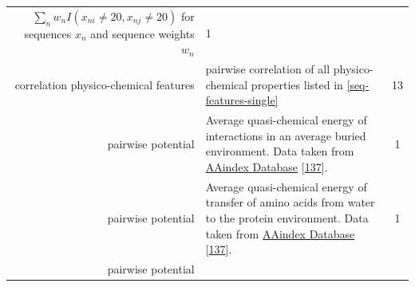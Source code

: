 \documentclass[12pt,a4paper,twoside]{book}
\theoremstyle{definition}
\theoremstyle{definition}
\theoremstyle{remark}
\begin{document}
\begin{longtable}[]{@{}rlc@{}}
\begin{minipage}[t]{0.50\columnwidth}
\(\sum_n w_n I(x_{ni} \! \neq \! 20, x_{nj} \! \neq \! 20)\) for
sequences \(x_n\) and sequence weights \(w_n\)\strut
\end{minipage} & \begin{minipage}[t]{0.18\columnwidth}\centering\strut
1\strut
\end{minipage}\tabularnewline
\begin{minipage}[t]{0.23\columnwidth}\raggedleft\strut
correlation physico-chemical features\strut
\end{minipage} & \begin{minipage}[t]{0.50\columnwidth}\raggedright\strut
pairwise correlation of all physico-chemical properties listed in
\ref{seq-features-single}\strut
\end{minipage} & \begin{minipage}[t]{0.18\columnwidth}\centering\strut
13\strut
\end{minipage}\tabularnewline
\begin{minipage}[t]{0.23\columnwidth}\raggedleft\strut
pairwise potential\strut
\end{minipage} & \begin{minipage}[t]{0.50\columnwidth}\raggedright\strut
Average quasi-chemical energy of interactions in an average buried
environment. Data taken from
\href{http://www.genome.jp/dbget-bin/www_bget?aaindex:MIYS990107}{AAindex
Database} {[}\protect\hyperlink{ref-Kawashima2008}{137}{]}.\strut
\end{minipage} & \begin{minipage}[t]{0.18\columnwidth}\centering\strut
1\strut
\end{minipage}\tabularnewline
\begin{minipage}[t]{0.23\columnwidth}\raggedleft\strut
pairwise potential\strut
\end{minipage} & \begin{minipage}[t]{0.50\columnwidth}\raggedright\strut
Average quasi-chemical energy of transfer of amino acids from water to
the protein environment. Data taken from
\href{http://www.genome.jp/dbget-bin/www_bget?aaindex:MIYS990106}{AAindex
Database} {[}\protect\hyperlink{ref-Kawashima2008}{137}{]}.\strut
\end{minipage} & \begin{minipage}[t]{0.18\columnwidth}\centering\strut
1\strut
\end{minipage}\tabularnewline
\begin{minipage}[t]{0.23\columnwidth}\raggedleft\strut
pairwise potential\strut
\end{minipage} & \begin{minipage}[t]{0.50\columnwidth}\raggedright\strut

\end{minipage}
\end{longtable}
\end{document}
